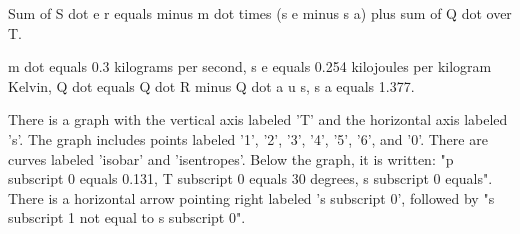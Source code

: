 Sum of S dot e r equals minus m dot times (s e minus s a) plus sum of Q dot over T.

m dot equals 0.3 kilograms per second, s e equals 0.254 kilojoules per kilogram Kelvin, Q dot equals Q dot R minus Q dot a u s, s a equals 1.377.

There is a graph with the vertical axis labeled 'T' and the horizontal axis labeled 's'. The graph includes points labeled '1', '2', '3', '4', '5', '6', and '0'. There are curves labeled 'isobar' and 'isentropes'. Below the graph, it is written: "p subscript 0 equals 0.131, T subscript 0 equals 30 degrees, s subscript 0 equals". There is a horizontal arrow pointing right labeled 's subscript 0', followed by "s subscript 1 not equal to s subscript 0".